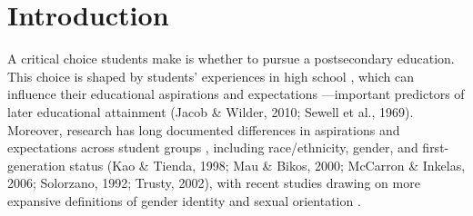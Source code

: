 %
%

\graphicspath{{Figures/}{Chapter3/Figures/}}

\section{Introduction}\label{introduction}

A critical choice students make is whether to pursue a postsecondary
education. This choice is shaped by students' experiences in high school
\citep{kurlaender2019a, reed2023a, uwah2008a}, which
can influence their educational aspirations and expectations \citep{bergerson2009a}---important predictors of later educational attainment (Jacob \&
Wilder, 2010; Sewell et al., 1969). Moreover, research has long
documented differences in aspirations and expectations across student
groups \citep{bergerson2009a}, including race/ethnicity, gender, and
first-generation status (Kao \& Tienda, 1998; Mau \& Bikos, 2000; McCarron
\& Inkelas, 2006; Solorzano, 1992; Trusty, 2002), with recent studies
drawing on more expansive definitions of gender identity and sexual
orientation \citep{aragon2014a, feldman2022a}.

